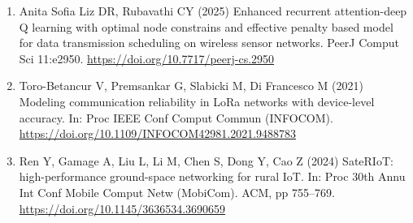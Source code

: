 \documentclass[
  11pt,
]{article}
\begin{document}
\begin{enumerate}
  Discov Internet Things 6:170.
  \url{https://doi.org/10.1007/s43926-026-00515-3}
\item
  Anita Sofia Liz DR, Rubavathi CY (2025) Enhanced recurrent
  attention-deep Q learning with optimal node constrains and effective
  penalty based model for data transmission scheduling on wireless
  sensor networks. PeerJ Comput Sci 11:e2950.
  \url{https://doi.org/10.7717/peerj-cs.2950}
\item
  Toro-Betancur V, Premsankar G, Slabicki M, Di Francesco M (2021)
  Modeling communication reliability in LoRa networks with device-level
  accuracy. In: Proc IEEE Conf Comput Commun (INFOCOM).
  \url{https://doi.org/10.1109/INFOCOM42981.2021.9488783}
\item
  Ren Y, Gamage A, Liu L, Li M, Chen S, Dong Y, Cao Z (2024) SateRIoT:
  high-performance ground-space networking for rural IoT. In: Proc 30th
  Annu Int Conf Mobile Comput Netw (MobiCom). ACM, pp 755--769.
  \url{https://doi.org/10.1145/3636534.3690659}
\end{enumerate}
\end{document}
